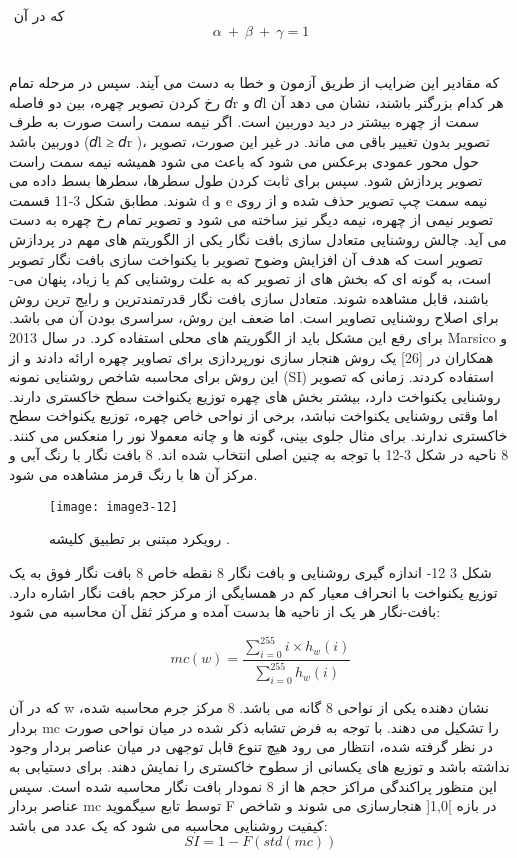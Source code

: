 که در آن
‏
\begin{equation}\label{eq3-8}
\alpha\ +\ \beta\ +\ \gamma=1	
\end{equation}‏

که مقادیر این ضرایب از طریق آزمون و خطا به دست می آیند. سپس در مرحله تمام رخ کردن تصویر چهره، بین دو فاصله 𝑑r و 𝑑l هر کدام بزرگتر باشند، نشان می دهد آن سمت از چهره بیشتر در دید دوربین است. اگر نیمه سمت راست صورت به طرف دوربین باشد (𝑑l ≥ 𝑑r )، تصویر بدون تغییر باقی می ماند. در غیر این صورت، تصویر حول محور عمودی برعکس می شود که باعث می شود همیشه نیمه سمت راست تصویر پردازش شود. سپس برای ثابت کردن طول سطرها، سطرها بسط داده می شوند. مطابق شکل 3-11 قسمت d و e نیمه سمت چپ تصویر حذف شده و از روی تصویر نیمی از چهره، نیمه دیگر نیز ساخته می شود و تصویر تمام رخ چهره به دست می آید.
	چالش روشنایی
متعادل سازی بافت نگار یکی از الگوریتم های مهم در پردازش تصویر است که هدف آن افزایش وضوح تصویر با یکنواخت سازی بافت نگار تصویر است، به گونه ای که بخش های از تصویر که به علت روشنایی کم یا زیاد، پنهان می-باشند، قابل مشاهده شوند. متعادل سازی بافت نگار قدرتمندترین و رایج ترین روش برای اصلاح روشنایی تصاویر است. اما ضعف این روش، سراسری بودن آن می باشد. برای رفع این مشکل باید از الگوریتم های محلی استفاده کرد.
در سال 2013 Marsico و همکاران در [26] یک روش هنجار سازی نورپردازی برای تصاویر چهره ارائه دادند و از این روش برای محاسبه شاخص روشنایی نمونه  (SI) استفاده کردند. زمانی که تصویر روشنایی یکنواخت دارد، بیشتر بخش های چهره توزیع یکنواخت سطح خاکستری دارند. اما وقتی روشنایی یکنواخت نباشد، برخی از نواحی خاص چهره، توزیع یکنواخت سطح خاکستری ندارند. برای مثال جلوی بینی، گونه ها و چانه معمولا نور را منعکس می کنند. 8 ناحیه در شکل 3-12 با توجه به چنین اصلی انتخاب شده اند. 8 بافت نگار با رنگ آبی و مرکز آن ها با رنگ قرمز مشاهده می شود.
 \begin{figure}[h]
\centering
  \texttt{[image: image3-12]}
  \caption{رویکرد مبتنی بر تطبیق کلیشه  \cite{ref1}.}
  \label{image2-1}
\end{figure}
شکل ‏3 12- اندازه گیری روشنایی و بافت نگار 8 نقطه خاص
8 بافت نگار فوق به یک توزیع یکنواخت با انحراف معیار کم در همسایگی از مرکز حجم بافت نگار اشاره دارد. بافت-نگار هر یک از ناحیه ها بدست آمده و مرکز ثقل آن محاسبه می شود:

\begin{equation}\label{eq3-9}
mc\left(w\right)=\frac{\sum_{i=0}^{255}{i\times h_w(i)}}{\sum_{i=0}^{255}{h_w(i)}}		
\end{equation}

که در آن w نشان دهنده یکی از نواحی 8 گانه می باشد. 8 مرکز جرم محاسبه شده، بردار mc را تشکیل می دهند. با توجه به فرض تشابه ذکر شده در میان نواحی صورت در نظر گرفته شده، انتظار می رود هیچ تنوع قابل توجهی در میان عناصر بردار وجود نداشته باشد و توزیع های یکسانی از سطوح خاکستری را نمایش دهند. برای دستیابی به این منظور پراکندگی مراکز حجم ها از 8 نمودار بافت نگار محاسبه شده است. سپس عناصر بردار mc توسط تابع سیگموید F در بازه ]1,0[ هنجارسازی می شوند و شاخص کیفیت روشنایی محاسبه می شود که یک عدد می باشد:
\begin{equation}\label{eq3-10}
SI=1-F(std\left(mc\right))	
\end{equation}

